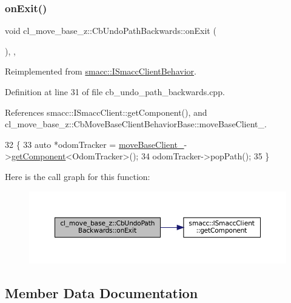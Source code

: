 \subsubsection{\texorpdfstring{on\+Exit()}{onExit()}}
{\footnotesize\ttfamily void cl\+\_\+move\+\_\+base\+\_\+z\+::\+Cb\+Undo\+Path\+Backwards\+::on\+Exit (\begin{DoxyParamCaption}{ }\end{DoxyParamCaption})\hspace{0.3cm}{\ttfamily [override]}, {\ttfamily [private]}, {\ttfamily [virtual]}}



Reimplemented from \hyperlink{classsmacc_1_1ISmaccClientBehavior_ad1198fdb2cbdf11f3276d3e23d4c0a50}{smacc\+::\+I\+Smacc\+Client\+Behavior}.



Definition at line 31 of file cb\+\_\+undo\+\_\+path\+\_\+backwards.\+cpp.



References smacc\+::\+I\+Smacc\+Client\+::get\+Component(), and cl\+\_\+move\+\_\+base\+\_\+z\+::\+Cb\+Move\+Base\+Client\+Behavior\+Base\+::move\+Base\+Client\+\_\+.


\begin{DoxyCode}
32 \{
33   \textcolor{keyword}{auto} *odomTracker = \hyperlink{classcl__move__base__z_1_1CbMoveBaseClientBehaviorBase_ab2ef219464cfac8659b4a87c8d0db6d5}{moveBaseClient\_}->\hyperlink{classsmacc_1_1ISmaccClient_adef78db601749ca63c19e74a27cb88cc}{getComponent}<OdomTracker>();
34   odomTracker->popPath();
35 \}
\end{DoxyCode}
Here is the call graph for this function\+:
\nopagebreak
\begin{figure}[H]
\begin{center}
\leavevmode
\includegraphics[width=350pt]{classcl__move__base__z_1_1CbUndoPathBackwards_a20cee921ad92db16f8d17c3c3b9c2daf_cgraph}
\end{center}
\end{figure}


\subsection{Member Data Documentation}
\mbox{\label{classcl__move__base__z_1_1CbUndoPathBackwards_add2b6a0f1c19654a0cf07209fc123a71}} 
